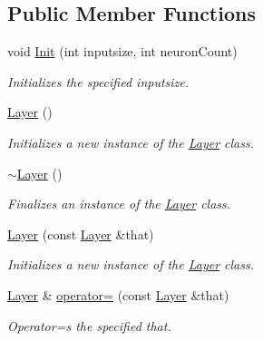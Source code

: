\subsection*{Public Member Functions}
\begin{DoxyCompactItemize}
\item 
void \hyperlink{class_n_n_t_lib_1_1_layer_acb8971ed21ec40118ba384750a0f5af8}{Init} (int inputsize, int neuron\+Count)
\begin{DoxyCompactList}\small\item\em Initializes the specified inputsize. \end{DoxyCompactList}\item 
\hyperlink{class_n_n_t_lib_1_1_layer_a4e30f7c8ff5426765c7c5b8f12c35c14}{Layer} ()
\begin{DoxyCompactList}\small\item\em Initializes a new instance of the \hyperlink{class_n_n_t_lib_1_1_layer}{Layer} class. \end{DoxyCompactList}\item 
\hyperlink{class_n_n_t_lib_1_1_layer_acd060e0c112f0ced1ce1530fa3e7e4bf}{$\sim$\+Layer} ()
\begin{DoxyCompactList}\small\item\em Finalizes an instance of the \hyperlink{class_n_n_t_lib_1_1_layer}{Layer} class. \end{DoxyCompactList}\item 
\hyperlink{class_n_n_t_lib_1_1_layer_acba87c68aaa9a258185bfe3a807cb841}{Layer} (const \hyperlink{class_n_n_t_lib_1_1_layer}{Layer} \&that)
\begin{DoxyCompactList}\small\item\em Initializes a new instance of the \hyperlink{class_n_n_t_lib_1_1_layer}{Layer} class. \end{DoxyCompactList}\item 
\hyperlink{class_n_n_t_lib_1_1_layer}{Layer} \& \hyperlink{class_n_n_t_lib_1_1_layer_aa7d4a78bec6093926dcf48eec2f87aeb}{operator=} (const \hyperlink{class_n_n_t_lib_1_1_layer}{Layer} \&that)
\begin{DoxyCompactList}\small\item\em Operator=s the specified that. \end{DoxyCompactList}\end{DoxyCompactItemize}
